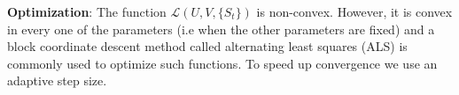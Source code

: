 \documentclass[runningheads,a4paper]{llncs}
\newcommand{\argmin}{\operatornamewithlimits{argmin}}
\begin{document}
%




\noindent \textbf{Optimization}:
The function $\mathcal{L}(U, V, \{S_t\})$ is non-convex. However, it is convex in every one of the parameters (i.e when the other parameters are fixed) 
and a block coordinate descent method called alternating least squares (ALS) is commonly used to optimize such functions. 
To speed up convergence we use an adaptive step size. %
\end{document}
